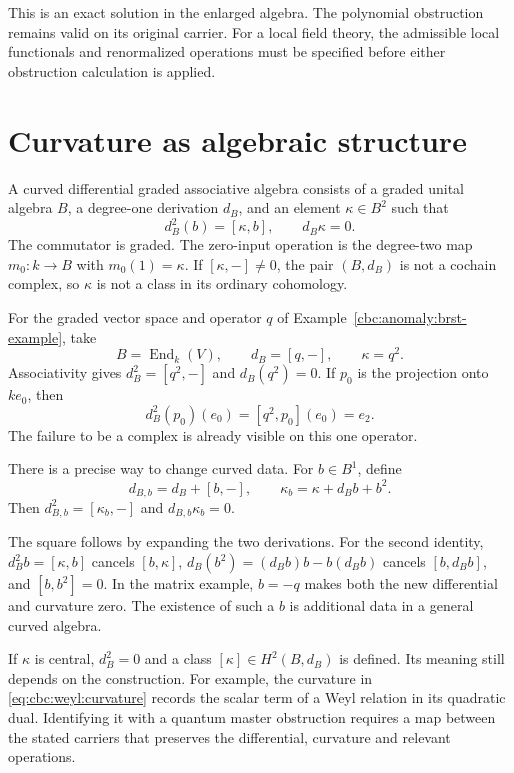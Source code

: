 This is an exact solution in the enlarged algebra.
The polynomial obstruction remains valid on its original carrier.
For a local field theory, the admissible local functionals and renormalized operations must be specified before either obstruction calculation is applied.

\section{Curvature as algebraic structure}

A curved differential graded associative algebra consists of a graded unital algebra $B$, a degree-one derivation $d_B$, and an element $\kappa\in B^2$ such that
\[
 d_B^2(b)=[\kappa,b],\qquad d_B\kappa=0.
\]
The commutator is graded.
The zero-input operation is the degree-two map $m_0:k\to B$ with $m_0(1)=\kappa$.
If $[\kappa,-]\ne0$, the pair $(B,d_B)$ is not a cochain complex, so $\kappa$ is not a class in its ordinary cohomology.

For the graded vector space and operator $q$ of Example~\ref{cbc:anomaly:brst-example}, take
\[
 B=\operatorname{End}_k(V),\qquad d_B=[q,-],\qquad \kappa=q^2.
\]
Associativity gives $d_B^2=[q^2,-]$ and $d_B(q^2)=0$.
If $p_0$ is the projection onto $ke_0$, then
\[
 d_B^2(p_0)(e_0)=[q^2,p_0](e_0)=e_2.
\]
The failure to be a complex is already visible on this one operator.

There is a precise way to change curved data.
For $b\in B^1$, define
\begin{equation}\label{eq:cbc:anomaly:curved-change}
 d_{B,b}=d_B+[b,-],\qquad
 \kappa_b=\kappa+d_Bb+b^2.
\end{equation}
Then $d_{B,b}^2=[\kappa_b,-]$ and $d_{B,b}\kappa_b=0$.

The square follows by expanding the two derivations.
For the second identity, $d_B^2b=[\kappa,b]$ cancels $[b,\kappa]$, $d_B(b^2)=(d_Bb)b-b(d_Bb)$ cancels $[b,d_Bb]$, and $[b,b^2]=0$.
In the matrix example, $b=-q$ makes both the new differential and curvature zero.
The existence of such a $b$ is additional data in a general curved algebra.

If $\kappa$ is central, $d_B^2=0$ and a class $[\kappa]\in H^2(B,d_B)$ is defined.
Its meaning still depends on the construction.
For example, the curvature in \eqref{eq:cbc:weyl:curvature} records the scalar term of a Weyl relation in its quadratic dual.
Identifying it with a quantum master obstruction requires a map between the stated carriers that preserves the differential, curvature and relevant operations.

